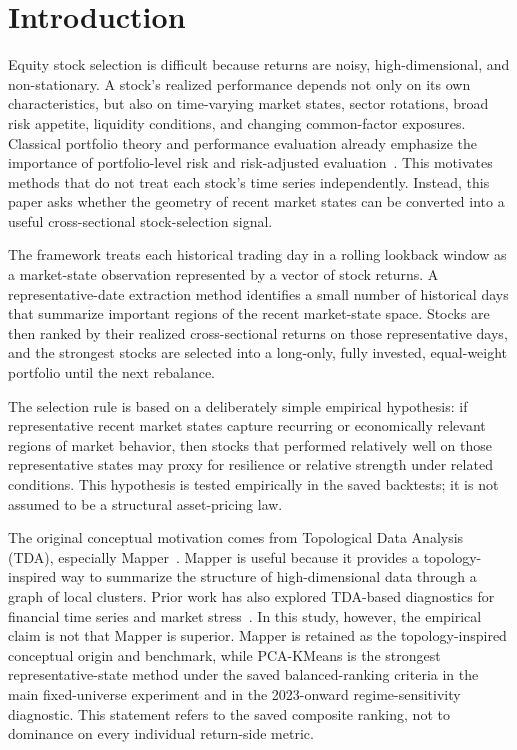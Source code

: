 \documentclass[runningheads]{llncs}
\begin{document}
\section{Introduction}

Equity stock selection is difficult because returns are noisy, high-dimensional, and non-stationary. A stock's realized performance depends not only on its own characteristics, but also on time-varying market states, sector rotations, broad risk appetite, liquidity conditions, and changing common-factor exposures. Classical portfolio theory and performance evaluation already emphasize the importance of portfolio-level risk and risk-adjusted evaluation~\cite{markowitz1952,sharpe1966}. This motivates methods that do not treat each stock's time series independently. Instead, this paper asks whether the geometry of recent market states can be converted into a useful cross-sectional stock-selection signal.

The framework treats each historical trading day in a rolling lookback window as a market-state observation represented by a vector of stock returns. A representative-date extraction method identifies a small number of historical days that summarize important regions of the recent market-state space. Stocks are then ranked by their realized cross-sectional returns on those representative days, and the strongest stocks are selected into a long-only, fully invested, equal-weight portfolio until the next rebalance.

The selection rule is based on a deliberately simple empirical hypothesis: if representative recent market states capture recurring or economically relevant regions of market behavior, then stocks that performed relatively well on those representative states may proxy for resilience or relative strength under related conditions. This hypothesis is tested empirically in the saved backtests; it is not assumed to be a structural asset-pricing law.

The original conceptual motivation comes from Topological Data Analysis (TDA), especially Mapper~\cite{singh2007,carlsson2009,edelsbrunner2010}. Mapper is useful because it provides a topology-inspired way to summarize the structure of high-dimensional data through a graph of local clusters. Prior work has also explored TDA-based diagnostics for financial time series and market stress~\cite{gidea2018,gidea2020crypto}. In this study, however, the empirical claim is not that Mapper is superior. Mapper is retained as the topology-inspired conceptual origin and benchmark, while PCA-KMeans is the strongest representative-state method under the saved balanced-ranking criteria in the main fixed-universe experiment and in the 2023-onward regime-sensitivity diagnostic. This statement refers to the saved composite ranking, not to dominance on every individual return-side metric.
\end{document}
